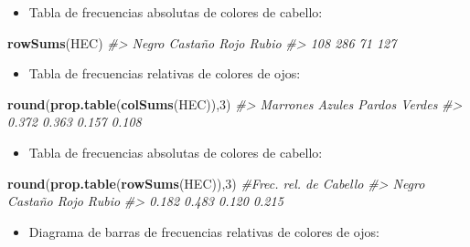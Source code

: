 \documentclass[
]{book}
\newenvironment{Shaded}{\begin{snugshade}}{\end{snugshade}}
\newcommand{\CommentTok}[1]{\textcolor[rgb]{0.56,0.35,0.01}{\textit{#1}}}
\newcommand{\DecValTok}[1]{\textcolor[rgb]{0.00,0.00,0.81}{#1}}
\newcommand{\KeywordTok}[1]{\textcolor[rgb]{0.13,0.29,0.53}{\textbf{#1}}}
\newcommand{\NormalTok}[1]{#1}
\providecommand{\tightlist}{%
  \setlength{\itemsep}{0pt}\setlength{\parskip}{0pt}}
\theoremstyle{definition}
\theoremstyle{definition}
\theoremstyle{definition}
\theoremstyle{remark}
\begin{document}
\begin{itemize}
\tightlist
\item
  Tabla de frecuencias absolutas de colores de cabello:
\end{itemize}

\begin{Shaded}
\begin{Highlighting}[]
\KeywordTok{rowSums}\NormalTok{(HEC)       }
\CommentTok{\#\textgreater{}   Negro Castaño    Rojo   Rubio }
\CommentTok{\#\textgreater{}     108     286      71     127}
\end{Highlighting}
\end{Shaded}

\begin{itemize}
\tightlist
\item
  Tabla de frecuencias relativas de colores de ojos:
\end{itemize}

\begin{Shaded}
\begin{Highlighting}[]
\KeywordTok{round}\NormalTok{(}\KeywordTok{prop.table}\NormalTok{(}\KeywordTok{colSums}\NormalTok{(HEC)),}\DecValTok{3}\NormalTok{)}
\CommentTok{\#\textgreater{} Marrones   Azules   Pardos   Verdes }
\CommentTok{\#\textgreater{}    0.372    0.363    0.157    0.108}
\end{Highlighting}
\end{Shaded}

\begin{itemize}
\tightlist
\item
  Tabla de frecuencias absolutas de colores de cabello:
\end{itemize}

\begin{Shaded}
\begin{Highlighting}[]
\KeywordTok{round}\NormalTok{(}\KeywordTok{prop.table}\NormalTok{(}\KeywordTok{rowSums}\NormalTok{(HEC)),}\DecValTok{3}\NormalTok{)   }\CommentTok{\#Frec. rel. de Cabello}
\CommentTok{\#\textgreater{}   Negro Castaño    Rojo   Rubio }
\CommentTok{\#\textgreater{}   0.182   0.483   0.120   0.215}
\end{Highlighting}
\end{Shaded}

\begin{itemize}
\tightlist
\item
  Diagrama de barras de frecuencias relativas de colores de ojos:
\end{itemize}
\end{document}
